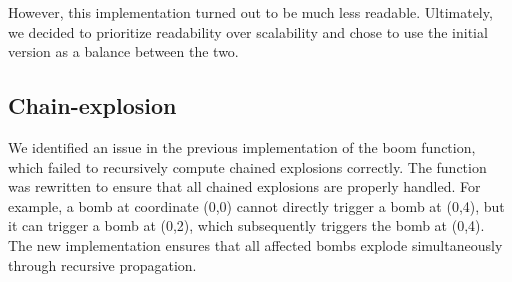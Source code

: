 \documentclass[12pt]{article}
\begin{document}
\indent However, this implementation turned out to be much less readable. Ultimately, we decided to prioritize readability over scalability and chose to use the initial version as a balance between the two.

\subsection*{Chain-explosion}

\hspace*{1.27cm}We identified an issue in the previous implementation of the boom function, which failed to recursively compute chained explosions correctly. The function was rewritten to ensure that all chained explosions are properly handled. For example, a bomb at coordinate (0,0) cannot directly trigger a bomb at (0,4), but it can trigger a bomb at (0,2), which subsequently triggers the bomb at (0,4). The new implementation ensures that all affected bombs explode simultaneously through recursive propagation.
\end{document}
